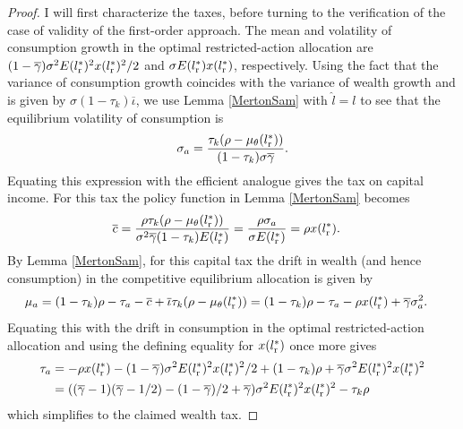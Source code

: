 \documentclass[11pt]{article}
\theoremstyle{plain}
\begin{document}
\begin{proof} %
I will first characterize the taxes, before turning to the verification of the case of validity of the first-order approach. The mean and volatility of consumption growth in the optimal restricted-action allocation are $(1-\overline{\gamma}) \sigma^2 E(l_{\textnormal{r}}^*)^2 x(l_{\textnormal{r}}^*)^2/2$ and $\sigma E(l_{\textnormal{r}}^*) x(l_{\textnormal{r}}^*)$, respectively. Using the fact that the variance of consumption growth coincides with the variance of wealth growth and is given by $\sigma(1-\tau_k)\overline{\iota}$, we use Lemma \ref{MertonSam} with $\hat{l} = l$ to see that the equilibrium volatility of consumption is
$$
\sigma_a = \frac{\tau_k(\rho - \mu_{\theta}(l_{\textnormal{r}}^*))}{(1-\tau_k)\sigma\overline{\gamma}}.
$$
Equating this expression with the efficient analogue gives the tax on capital income. For this tax the policy function in Lemma \ref{MertonSam} becomes 
\begin{align*}
\overline{c} & = \frac{\rho\tau_k(\rho - \mu_{\theta}(l_{\textnormal{r}}^*))}{\sigma^2\overline{\gamma}(1-\tau_k)E(l_{\textnormal{r}}^*)}
 = \frac{\rho \sigma_a}{\sigma E(l_{\textnormal{r}}^*)} = \rho x(l_{\textnormal{r}}^*).
\end{align*}
By Lemma \ref{MertonSam}, for this capital tax the drift in wealth (and hence consumption) in the competitive equilibrium allocation is given by
\begin{align*}
\mu_a & = (1-\tau_k)\rho - \tau_a - \overline{c} + \overline{\iota} \tau_k( \rho  - \mu_{\theta}(l_{\textnormal{r}}^*))
 = (1-\tau_k)\rho - \tau_a - \rho x(l_{\textnormal{r}}^*) + \overline{\gamma}\sigma_a^2. %
\end{align*}
Equating this with the drift in consumption in the optimal restricted-action allocation and using the defining equality for $x(l_{\textnormal{r}}^*)$ once more gives 
\begin{align*}
\tau_a & = -\rho x(l_{\textnormal{r}}^*) - (1-\overline{\gamma})\sigma^2 E(l_{\textnormal{r}}^*)^2 x(l_{\textnormal{r}}^*)^2/2 + (1-\tau_k)\rho + \overline{\gamma} \sigma^2 E(l_{\textnormal{r}}^*)^2x(l_{\textnormal{r}}^*)^2
\\ & = {\left( (\overline{\gamma}-1)(\overline{\gamma}-1/2) - (1-\overline{\gamma})/2 + \overline{\gamma} \right)}\sigma^2 E(l_{\textnormal{r}}^*)^2x(l_{\textnormal{r}}^*)^2 - \tau_k\rho
\end{align*}
which simplifies to the claimed wealth tax. 
\end{proof} 
\end{document}
